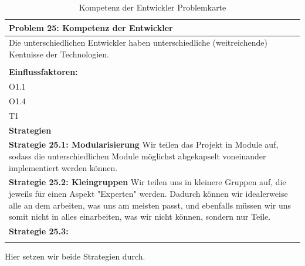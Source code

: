 \documentclass[fontsize=12pt,paper=a4,twoside]{scrartcl}
\begin{document}
\begin{table}[H]
    \centering
    \begin{tabular}{|p{15cm}|}
    \hline
          \textbf{Problem 25: Kompetenz der Entwickler}  \\ \hline
	Die unterschiedlichen Entwickler haben unterschiedliche (weitreichende) Kentnisse der Technologien. \\
         \\ \hline
          \textbf{Einflussfaktoren: } \\
	O1.1 \\
	O1.4 \\
	T1 \\
          \hline
          \textbf{Strategien} \\ \hline
            {}          
           \label{strategie:25.1}     
          \textbf{Strategie 25.1: Modularisierung} Wir teilen das Projekt in Module auf, sodass die unterschiedlichen Module möglichst abgekapselt voneinander implementiert werden können. \\        
  {}          
           \label{strategie:25.2}              
          \textbf{Strategie 25.2: Kleingruppen} Wir teilen uns in kleinere Gruppen auf, die jeweils für einen Aspekt "Experten" werden. Dadurch können wir idealerweise alle an dem arbeiten, was uns am meisten passt, und ebenfalls müssen wir uns somit nicht in alles einarbeiten, was wir nicht können, sondern nur Teile. \\
	 {}          
           \label{strategie:25.3}     
          \textbf{Strategie 25.3: }  \\ 
	 \\ \hline
    \end{tabular}

    \caption{Kompetenz der Entwickler Problemkarte}
    \label{tab:ProblemKarte25}
\end{table}
Hier setzen wir beide Strategien durch. \\
\end{document}

